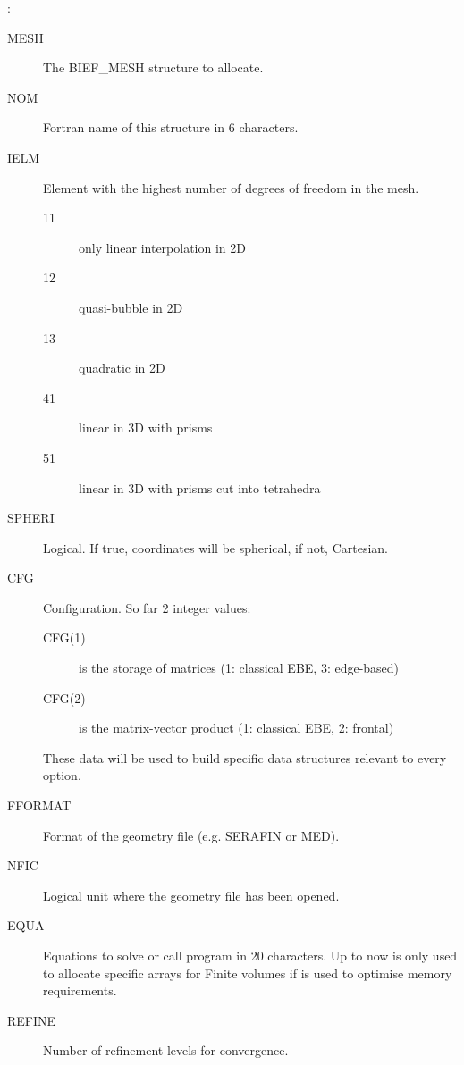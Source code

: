 :
\begin{description}
\item [MESH] The BIEF\_MESH structure to allocate.
\item [NOM] Fortran name of this structure in 6 characters.
\item [IELM] Element with the highest number of degrees of freedom in the mesh.
  \begin{description}
  \item [11] only linear interpolation in 2D
  \item [12] quasi-bubble in 2D
  \item [13] quadratic in 2D
  \item [41] linear in 3D with prisms
  \item [51] linear in 3D with prisms cut into tetrahedra
  \end{description}
\item [SPHERI] Logical. If true, coordinates will be spherical, if not, Cartesian.
\item [CFG] Configuration. So far 2 integer values:
  \begin{description}
    \item [CFG(1)] is the storage of matrices (1: classical EBE, 3: edge-based)
    \item [CFG(2)] is the matrix-vector product (1: classical EBE, 2: frontal)
  \end{description}
   These data will be used to build specific data structures relevant to
   every option.
\item [FFORMAT] Format of the geometry file (e.g. SERAFIN or MED).
\item [NFIC] Logical unit where the geometry file has been opened.
\item [EQUA] Equations to solve or call program in 20 characters. Up to
  now is only used to allocate specific arrays for Finite volumes if
   is used to optimise memory requirements.
\item [REFINE] Number of refinement levels for convergence.
\end{description}


